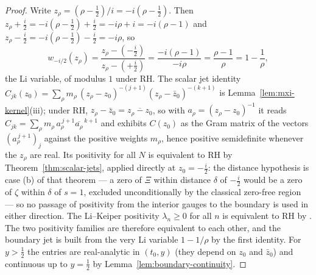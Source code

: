 \documentclass[11pt]{amsart}
\theoremstyle{definition}
\theoremstyle{remark}
\theoremstyle{definition}
\newcommand{\half}{\tfrac{1}{2}}
\begin{document}
\begin{proof}
Write $z_\rho=(\rho-\half)/i=-i(\rho-\half)$.  Then $z_\rho+\tfrac{i}{2}=-i(\rho-\half)+\tfrac{i}{2}
=-i\rho+i=-i(\rho-1)$ and $z_\rho-\tfrac{i}{2}=-i(\rho-\half)-\tfrac{i}{2}=-i\rho$, so
\[
   w_{-i/2}(z_\rho)=\frac{z_\rho-(-\tfrac{i}{2})}{z_\rho-(+\tfrac{i}{2})}
   =\frac{-i(\rho-1)}{-i\rho}=\frac{\rho-1}{\rho}=1-\frac1\rho,
\]
the Li variable, of modulus $1$ under RH.  The scalar jet identity
$C_{jk}(z_0)=\sum_\rho m_\rho\,(z_\rho-z_0)^{-(j+1)}(z_\rho-\bar z_0)^{-(k+1)}$ is
Lemma~\ref{lem:mxi-kernel}(iii); under RH, $z_\rho-\bar z_0=\overline{z_\rho-z_0}$, so with
$a_\rho=(z_\rho-z_0)^{-1}$ it reads $C_{jk}=\sum_\rho m_\rho\,a_\rho^{\,j+1}\overline{a_\rho}^{\,k+1}$
and exhibits $C(z_0)$ as the Gram matrix of the vectors
$(a_\rho^{\,j+1})_j$ against the positive weights $m_\rho$, hence positive semidefinite whenever the
$z_\rho$ are real.  Its positivity for all $N$ is equivalent to RH by
Theorem~\ref{thm:scalar-jets}, applied directly at $z_0=-\tfrac i2$: the distance hypothesis is case (b)
of that theorem --- a zero of $\Xi$ within distance $\delta$ of $-\tfrac i2$ would be a zero of $\zeta$
within $\delta$ of $s=1$, excluded unconditionally by the classical zero-free region --- so no passage
of positivity from the interior gauges to the boundary is used in either direction.
The Li--Keiper positivity $\lambda_n\ge0$ for all $n$ is equivalent to
RH by \cite{Li,Keiper1992}.  The two positivity families are therefore equivalent to each other, and
the boundary jet is built from the very Li variable $1-1/\rho$ by the first identity.  For $y>\half$ the entries are real-analytic in $(t_0,y)$ (they depend on $z_0$ and $\bar z_0$) and
continuous up to $y=\half$ by Lemma~\ref{lem:boundary-continuity}.
\end{proof}
\end{document}
